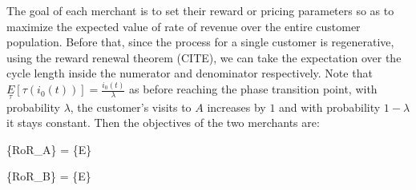 The goal of each merchant is to set their reward or pricing parameters so as to maximize the expected value of rate of revenue over the entire customer population.
Before that, since the process for a single customer is regenerative, using the reward renewal theorem (CITE), we can take the expectation over the cycle length inside the numerator and denominator respectively.
Note that $\underset{\tau}E[\tau(i_0(t))] = \frac{i_0(t)}{\lambda}$ as before reaching the phase transition point, with probability $\lambda$, the customer's visits to $A$ increases by $1$ and with probability $1-\lambda$ it stays constant.
Then the objectives of the two merchants are:

\beq
{}\max\left\{RoR_A\right\} = \max\left\{E\right\}
\eeq

\beq
{}\max\left\{RoR_B\right\} = \max\left\{E\right\}
\eeq
